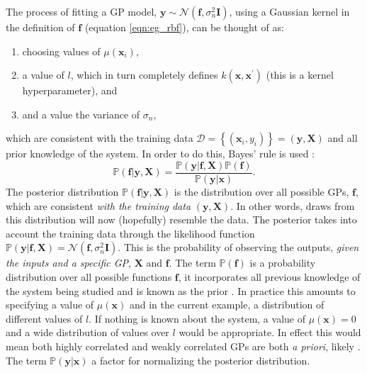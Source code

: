 The process of fitting a GP model, $\mathbf{y} \sim \mathcal{N}(\mathbf{f}, \sigma_{n}^{2}\mathbf{I})$, using a Gaussian kernel in the definition of $\mathbf{f}$ (equation \ref{eqn:eg_rbf}), can be thought of as: 
\begin{enumerate}
    \item choosing values of $\mu(\mathbf{x}_{i})$,
    \item a value of $l$, which in turn completely defines $k(\mathbf{x}, \mathbf{x}^{\prime})$ (this is a kernel hyperparameter), and
    \item and a value the variance of $\sigma_{n}$, 
\end{enumerate}  
which are consistent with the training data $\mathcal{D}=\left\{(\mathbf{x}_{i}, y_{i})\right\} = (\mathbf{y}, \mathbf{X})$ and all prior knowledge of the system. In order to do this,  Bayes' rule is used \cite{rasmussenGaussianProcessesMachine2006}:
\begin{equation}\label{eqn:ya_boy_bayes}
    \mathbb{P}(\mathbf{f}|\mathbf{y}, \mathbf{X})  = \frac{\mathbb{P}(\mathbf{y}|\mathbf{f}, \mathbf{X})\mathbb{P}(\mathbf{f})}{\mathbb{P}(\mathbf{y}|\mathbf{x})}. 
\end{equation}
The posterior distribution $\mathbb{P}(\mathbf{f}|\mathbf{y}, \mathbf{X})$ is the distribution over all possible GPs, $\mathbf{f}$, which are consistent \emph{with the training data} $(\mathbf{y}, \mathbf{X})$. In other words, draws from this distribution will now (hopefully) resemble the data. The posterior takes into account the training data  through the likelihood function $\mathbb{P}(\mathbf{y}|\mathbf{f}, \mathbf{X}) = \mathcal{N}(\mathbf{f}, \sigma_{n}^{2}\mathbf{I})$. This is the probability of observing the outputs, \emph{given the inputs and a specific GP}, $\mathbf{X}$ and $\mathbf{f}$.  The term $\mathbb{P}(\mathbf{f})$ is a probability distribution over all possible functions $\mathbf{f}$, it incorporates all previous knowledge of the system being studied and is known as the prior \cite{gelmanBayesianDataAnalysis2014}.  In practice this amounts to specifying a value of $\mu(\mathbf{x})$ and in the current example, a distribution of different values of $l$.  If nothing is known about the system, a value of $\mu(\mathbf{x})=0$ and a wide distribution of values over $l$ would be appropriate. In effect this would mean both highly correlated and weakly correlated GPs are both \emph{a priori}, likely \cite{gelmanBayesianDataAnalysis2014}.  The term $\mathbb{P}(\mathbf{y}|\mathbf{x})$  a factor for normalizing the posterior distribution. 

